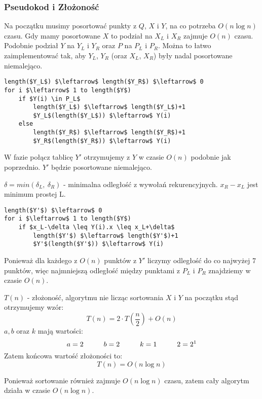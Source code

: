\subsubsection{Pseudokod i Złożoność}
Na początku musimy posortować punkty z $Q$, $X$ i $Y$, na co potrzeba $O(n \log n)$ czasu. Gdy mamy posortowane $X$ to podział na $X_L$ i $X_R$ zajmuje $O(n)$ czasu. Podobnie podział $Y$ na $Y_L$ i $Y_R$ oraz $P$ na $P_L$ i $P_R$. Można to łatwo zaimplementować tak, aby $Y_L$, $Y_R$ (oraz $X_L$, $X_R$) były nadal posortowane niemalejąco.

\begin{lstlisting}
length($Y_L$) $\leftarrow$ length($Y_R$) $\leftarrow$ 0
for i $\leftarrow$ 1 to length($Y$)
	if $Y(i) \in P_L$ 
    	length($Y_L$) $\leftarrow$ length($Y_L$)+1
    	$Y_L$(length($Y_L$)) $\leftarrow$ Y(i)
	else
    	length($Y_R$) $\leftarrow$ length($Y_R$)+1
    	$Y_R$(length($Y_R$)) $\leftarrow$ Y(i)
\end{lstlisting}

W fazie połącz tablicę $Y'$ otrzymujemy z $Y$ w czasie $O(n)$ podobnie jak poprzednio. $Y'$ będzie posortowane niemalejąco. 

$\delta = min(\delta_L,\ \delta_R)$ - minimalna odległość z wywołań rekurencyjnych. $x_R-x_L$ jest minimum prostej L.

\begin{lstlisting}
length($Y'$) $\leftarrow$ 0
for i $\leftarrow$ 1 to length($Y$)
	if $x_L-\delta \leq Y(i).x \leq x_L+\delta$ 
    	length($Y'$) $\leftarrow$ length($Y'$)+1
    	$Y'$(length($Y'$)) $\leftarrow$ Y(i)
\end{lstlisting}

Ponieważ dla każdego z $O(n)$ punktów z $Y'$ liczymy odległość do co najwyżej 7 punktów, więc najmniejszą odległość między punktami z $P_L$ i $P_R$ znajdziemy w czasie $O(n)$.

$T(n)$ - złożoność, algorytmu nie licząc sortowania $X$ i $Y$ na początku stąd otrzymujemy wzór:
$$T(n) = 2 \cdot T(\frac{n}{2})+O(n)$$
$a,b$ oraz $k$ mają wartości:
$$a=2 \hspace*{1cm} b=2 \hspace*{1cm} k=1 \hspace*{1cm} 2=2^1$$
Zatem końcowa wartość złożoności to:
$$T(n) = O(n \log n)$$

Ponieważ sortowanie również zajmuje $O(n \log n)$ czasu, zatem cały algorytm działa w czasie $O(n \log n)$.